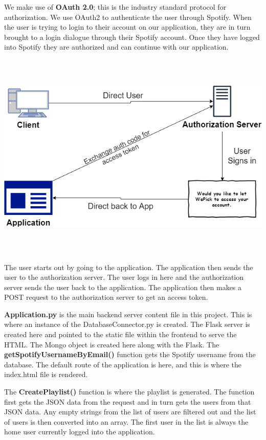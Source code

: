 We make use of \textbf{OAuth 2.0}; this is the industry standard protocol for authorization. We use OAuth2 to authenticate the user through Spotify.\cite{OAuth2} When the user is trying to login to their account on our application, they are in turn brought to a login dialogue through their Spotify account. Once they have logged into Spotify they are authorized and can continue with our application.\newline

\begin{center}    
	\includegraphics[width=14cm, height=10cm]{img/auth.png}
\end{center}
The user starts out by going to the application. The application then sends the user to the authorization server. The user logs in here and the authorization server sends the user back to the application. The application then makes a POST request to the authorization server to get an access token.\newline

\textbf{Application.py} is the main backend server content file in this project. This is where an instance of the DatabaseConnector.py is created. The Flask server is created here and pointed to the static file within the frontend to serve the HTML. The Mongo object is created here along with the Flask. The \textbf{getSpotifyUsernameByEmail()} function gets the Spotify username from the database. The default route of the application is here, and this is where the index.html file is rendered.\newline

The \textbf{CreatePlaylist()} function is where the playlist is generated. The function first gets the JSON data from the request and in turn gets the users from that JSON data. Any empty strings from the list of users are filtered out and the list of users is then converted into an array. The first user in the list is always the home user currently logged into the application.\newline

